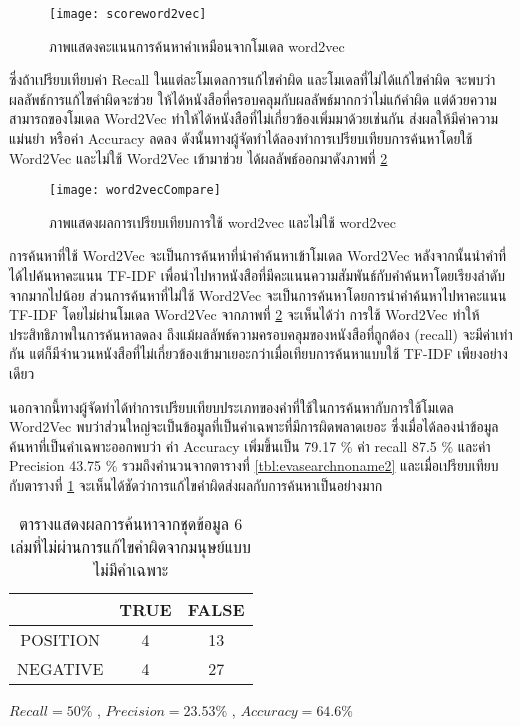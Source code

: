 \begin{figure}[H]
    \centering
    \texttt{[image: scoreword2vec]}
    \caption{ภาพแสดงคะแนนการค้นหาคำเหมือนจากโมเดล word2vec}\label{fig:scoreword2vec}
\end{figure}


ซึ่งถ้าเปรียบเทียบค่า Recall ในแต่ละโมเดลการแก้ไขคำผิด และโมเดลที่ไม่ได้แก้ไขคำผิด จะพบว่าผลลัพธ์การแก้ไขคำผิดจะช่วย
ให้ได้หนังสือที่ครอบคลุมกับผลลัพธ์มากกว่าไม่แก้คำผิด แต่ด้วยความสามารถของโมเดล 
Word2Vec ทำให้ได้หนังสือที่ไม่เกี่ยวข้องเพิ่มมาด้วยเช่นกัน ส่งผลให้มีค่าความแม่นยำ 
หรือค่า Accuracy ลดลง ดังนั้นทางผู้จัดทำได้ลองทำการเปรียบเทียบการค้นหาโดยใช้ 
Word2Vec และไม่ใช้ Word2Vec เข้ามาช่วย ได้ผลลัพธ์ออกมาดังภาพที่ \ref{fig:word2vecCompare}

\begin{figure}[H]
    \centering
    \texttt{[image: word2vecCompare]}
    \caption{ภาพแสดงผลการเปรียบเทียบการใช้ word2vec และไม่ใช้ word2vec}\label{fig:word2vecCompare}
\end{figure}

การค้นหาที่ใช้ Word2Vec จะเป็นการค้นหาที่นำคำค้นหาเข้าโมเดล Word2Vec หลังจากนั้นนำคำที่ได้ไปค้นหาคะแนน TF-IDF เพื่อนำไปหาหนังสือที่มีคะแนนความสัมพันธ์กับคำค้นหาโดยเรียงลำดับจากมากไปน้อย 
ส่วนการค้นหาที่ไม่ใช้ Word2Vec จะเป็นการค้นหาโดยการนำคำค้นหาไปหาคะแนน TF-IDF โดยไม่ผ่านโมเดล Word2Vec
จากภาพที่ \ref{fig:word2vecCompare}  จะเห็นได้ว่า การใช้ Word2Vec ทำให้ประสิทธิภาพในการค้นหาลดลง ถึงแม้ผลลัพธ์ความครอบคลุมของหนังสือที่ถูกต้อง (recall) จะมีค่าเท่ากัน 
แต่ก็มีจำนวนหนังสือที่ไม่เกี่ยวข้องเข้ามาเยอะกว่าเมื่อเทียบการค้นหาแบบใช้ TF-IDF เพียงอย่างเดียว

นอกจากนี้ทางผู้จัดทำได้ทำการเปรียบเทียบประเภทของคำที่ใช้ในการค้นหากับการใช้โมเดล Word2Vec 
พบว่าส่วนใหญ่จะเป็นข้อมูลที่เป็นคำเฉพาะที่มีการผิดพลาดเยอะ
ซึ่งเมื่อได้ลองนำข้อมูลค้นหาที่เป็นคำเฉพาะออกพบว่า ค่า Accuracy เพิ่มขึ้นเป็น 79.17 \% ค่า recall 87.5 \% และค่า Precision 43.75 \% 
รวมถึงคำนวนจากตารางที่ \ref{tbl:evasearchnoname2} และเมื่อเปรียบเทียบกับตารางที่ \ref{tbl:evasearchnoname} จะเห็นได้ชัดว่าการแก้ไขคำผิดส่งผลกับการค้นหาเป็นอย่างมาก

\begin{table}[H]
    \caption{ตารางแสดงผลการค้นหาจากชุดข้อมูล 6 เล่มที่ไม่ผ่านการแก้ไขคำผิดจากมนุษย์แบบไม่มีคำเฉพาะ}\label{tbl:evasearchnoname}
    \begin{tabular}{|c|c|c|}
    \hline
                & TRUE & FALSE \\ \hline
    POSITION & 4   & 13   \\ \hline
    NEGATIVE & 4   & 27   \\ \hline
    \end{tabular}
    \end{table}
    $Recall = 50 \%$ , $Precision = 23.53 \%$ , $Accuracy = 64.6 \%$

